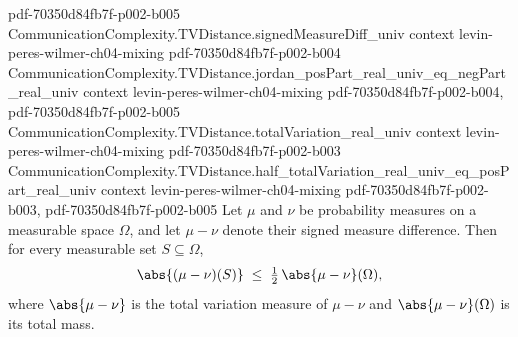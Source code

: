 \begin{lemma}
{    pdf-70350d84fb7f-p002-b005}
\proofstep
  {CommunicationComplexity.TVDistance.signedMeasureDiff_univ}
  {context}
  {levin-peres-wilmer-ch04-mixing}
  {pdf-70350d84fb7f-p002-b004}
\proofstep
  {CommunicationComplexity.TVDistance.jordan_posPart_real_univ_eq_negPart_real_univ}
  {context}
  {levin-peres-wilmer-ch04-mixing}
  {pdf-70350d84fb7f-p002-b004,
    pdf-70350d84fb7f-p002-b005}
\proofstep
  {CommunicationComplexity.TVDistance.totalVariation_real_univ}
  {context}
  {levin-peres-wilmer-ch04-mixing}
  {pdf-70350d84fb7f-p002-b003}
\proofstep
  {CommunicationComplexity.TVDistance.half_totalVariation_real_univ_eq_posPart_real_univ}
  {context}
  {levin-peres-wilmer-ch04-mixing}
  {pdf-70350d84fb7f-p002-b003,
    pdf-70350d84fb7f-p002-b005}
Let $\mu$ and $\nu$ be probability measures on a measurable space $\Omega$, and let $\mu
- \nu$ denote their signed measure difference. Then for every measurable set $S
\subseteq \Omega$,
\[
  \abs{(\mu - \nu)(S)} \;\le\; \tfrac{1}{2}\, \abs{\mu - \nu}(\Omega),
\]
where $\abs{\mu - \nu}$ is the total variation measure of $\mu - \nu$ and $\abs{\mu -
\nu}(\Omega)$ is its total mass.
\end{lemma}

